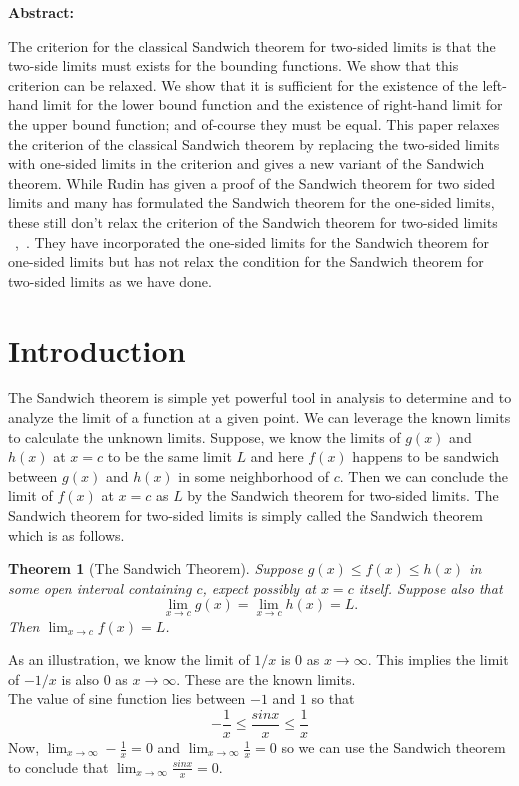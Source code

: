 \documentclass[a4paper,twoside,12pt]{article}
\theoremstyle{plain}
\newtheorem{theorem}{Theorem}[section]
\theoremstyle{definition}
\theoremstyle{theorem}
\begin{document}
\vspace{5mm}
\noindent
\textbf{Abstract:} {The criterion for the classical Sandwich theorem for two-sided limits is that the two-side limits must exists for the bounding functions. We show that this criterion can be relaxed. We show that it is sufficient for the existence of the left-hand limit for the lower bound function and the existence of right-hand limit for the upper bound function; and of-course they must be equal. This paper relaxes the criterion of the classical Sandwich theorem by replacing the two-sided limits with one-sided limits in the criterion and gives a new variant of the Sandwich theorem. While Rudin has given a proof of the Sandwich theorem for two sided limits and many has formulated the Sandwich theorem for the one-sided limits, these still don't relax the criterion of the Sandwich theorem for two-sided limits ~\cite{rudin},~\cite{thomas}. They have incorporated the one-sided limits for the Sandwich theorem for one-sided limits but has not relax the condition for the Sandwich theorem for two-sided limits as we have done.
\section{Introduction}
The Sandwich theorem is simple yet powerful tool in analysis to determine and to analyze the limit of a function at a given point. We can leverage the known limits to calculate the unknown limits. Suppose, we know the limits of \(g(x)\) and \(h(x)\) at \(x=c\) to be the same limit \(L\) and here \(f(x)\) happens to be sandwich between \(g(x)\) and \(h(x)\) in some neighborhood of \(c\). Then we can conclude the limit of \(f(x)\) at \(x=c\) as \(L\) by the Sandwich theorem for two-sided limits. The Sandwich theorem for two-sided limits is simply called the Sandwich theorem which is as follows.

\begin{theorem}[The Sandwich Theorem] \cite{thomas}
  \label{two-side}
Suppose $g(x) \leq f(x) \leq h(x)$ in some open interval containing $c$, expect possibly at $x=c$ itself. Suppose also that $$\lim_{x \to c} g(x) = \lim_{x \to c} h(x) =L  .$$ Then $\displaystyle \lim_{x \to c} f(x)=L$.
\end{theorem}


As an illustration, we know the limit of \(1/x\) is \(0\) as \(x
\to \infty\). This implies the limit of \(-1/x\) is also \(0\) as \(x \to \infty\). These are the known limits.\\
The value of sine function lies between \(-1\) and \(1\) so that \[\displaystyle -\frac{1}{x} \leq \frac{sinx}{x} \leq \frac{1}{x}\]
Now, \(\displaystyle \lim_{x \to \infty} -\frac{1}{x}=0\) and \(\displaystyle \lim_{x \to \infty} \frac{1}{x}=0\) so we can use the Sandwich theorem to conclude that \(\displaystyle \lim_{x \to \infty} \frac{sinx}{x}=0\).
\vspace{5mm}
}
\end{document}
